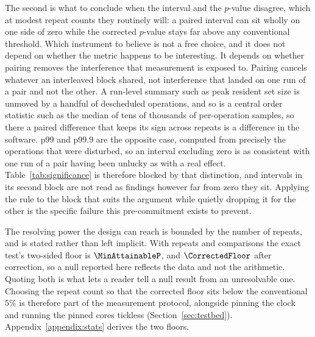 The second is what to conclude when the interval and the $p$-value disagree, which at modest
repeat counts they routinely will: a paired interval can sit wholly on one side of zero while
the corrected $p$-value stays far above any conventional threshold. Which instrument to believe
is not a free choice, and it does not depend on whether the metric happens to be interesting. It
depends on whether pairing removes the interference that measurement is exposed to. Pairing
cancels whatever an interleaved block shared, not interference that landed on one run of a pair
and not the other. A run-level summary such as peak resident set size is unmoved by a handful of
descheduled operations, and so is a central order statistic such as the median of tens of
thousands of per-operation samples, so there a paired difference that keeps its sign across
repeats is a difference in the software. p99 and p99.9 are the opposite case, computed from
precisely the operations that were disturbed, so an interval excluding zero is as consistent
with one run of a pair having been unlucky as with a real effect.
Table~\ref{tab:significance} is therefore blocked by that distinction, and intervals in its
second block are not read as findings however far from zero they sit. Applying the rule to the
block that suits the argument while quietly dropping it for the other is the specific failure
this pre-commitment exists to prevent.

The resolving power the design can reach is bounded by the number of repeats, and is stated
rather than left implicit. With \NRepeats{} repeats and \NTests{} comparisons the exact test's
two-sided floor is $\MinAttainableP$, and $\CorrectedFloor$ after correction, so a null reported
here reflects the data and not the arithmetic. Quoting both is what lets a reader tell a null
result from an unresolvable one. Choosing the repeat count so that the corrected floor sits below
the conventional $5\%$ is therefore part of the measurement protocol, alongside pinning the clock
and running the pinned cores tickless (Section~\ref{sec:testbed}).
Appendix~\ref{appendix:stats} derives the two floors.

